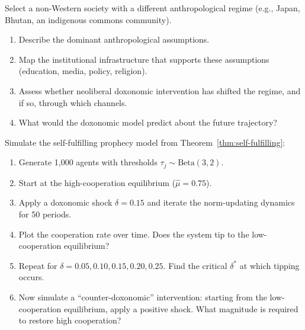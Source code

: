 \begin{exercise}
Select a non-Western society with a different anthropological regime (e.g., Japan, Bhutan, an indigenous commons community).
\begin{enumerate}[nosep]
  \item Describe the dominant anthropological assumptions.
  \item Map the institutional infrastructure that supports these assumptions (education, media, policy, religion).
  \item Assess whether neoliberal doxonomic intervention has shifted the regime, and if so, through which channels.
  \item What would the doxonomic model predict about the future trajectory?
\end{enumerate}
\end{exercise}

\begin{exercise}[Computational]
Simulate the self-fulfilling prophecy model from Theorem~\ref{thm:self-fulfilling}:
\begin{enumerate}[nosep]
  \item Generate 1,000 agents with thresholds $\tau_j \sim \text{Beta}(3, 2)$.
  \item Start at the high-cooperation equilibrium ($\hat{\mu} = 0.75$).
  \item Apply a doxonomic shock $\delta = 0.15$ and iterate the norm-updating dynamics for 50 periods.
  \item Plot the cooperation rate over time. Does the system tip to the low-cooperation equilibrium?
  \item Repeat for $\delta = 0.05, 0.10, 0.15, 0.20, 0.25$. Find the critical $\delta^*$ at which tipping occurs.
  \item Now simulate a ``counter-doxonomic'' intervention: starting from the low-cooperation equilibrium, apply a positive shock. What magnitude is required to restore high cooperation?
\end{enumerate}
\end{exercise}
